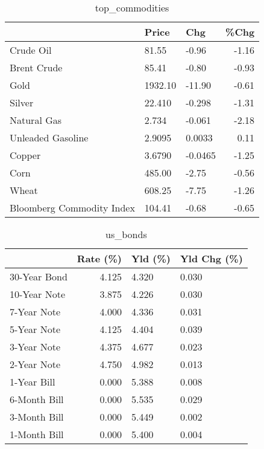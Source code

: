 \documentclass{article}%
\begin{document}
\begin{table}[htbp]%
\caption{top\_commodities}%
\centering%
\begin{adjustbox}{width=1\textwidth}%
\begin{tabular}{lllr}
\toprule
                          &   Price &     Chg &  \%Chg \\
\midrule
               Crude Oil  &   81.55 &   -0.96 & -1.16 \\
             Brent Crude  &   85.41 &   -0.80 & -0.93 \\
                    Gold  & 1932.10 &  -11.90 & -0.61 \\
                  Silver  &  22.410 &  -0.298 & -1.31 \\
             Natural Gas  &   2.734 &  -0.061 & -2.18 \\
       Unleaded Gasoline  &  2.9095 &  0.0033 &  0.11 \\
                  Copper  &  3.6790 & -0.0465 & -1.25 \\
                    Corn  &  485.00 &   -2.75 & -0.56 \\
                   Wheat  &  608.25 &   -7.75 & -1.26 \\
Bloomberg Commodity Index &  104.41 &   -0.68 & -0.65 \\
\bottomrule
\end{tabular}
%
\end{adjustbox}%
\end{table}

%


\begin{table}[htbp]%
\caption{us\_bonds}%
\centering%
\begin{adjustbox}{width=1\textwidth}%
\begin{tabular}{lrll}
\toprule
             &  Rate (\%) & Yld (\%) & Yld Chg (\%) \\
\midrule
30-Year Bond &     4.125 &   4.320 &       0.030 \\
10-Year Note &     3.875 &   4.226 &       0.030 \\
 7-Year Note &     4.000 &   4.336 &       0.031 \\
 5-Year Note &     4.125 &   4.404 &       0.039 \\
 3-Year Note &     4.375 &   4.677 &       0.023 \\
 2-Year Note &     4.750 &   4.982 &       0.013 \\
 1-Year Bill &     0.000 &   5.388 &       0.008 \\
6-Month Bill &     0.000 &   5.535 &       0.029 \\
3-Month Bill &     0.000 &   5.449 &       0.002 \\
1-Month Bill &     0.000 &   5.400 &       0.004 \\
\bottomrule
\end{tabular}
%
\end{adjustbox}%
\end{table}
\end{document}
